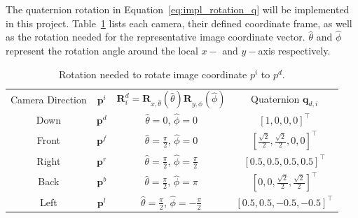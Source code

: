 The quaternion rotation in Equation~\eqref{eq:impl_rotation_q} will be implemented in this project. Table~\ref{tab:impl_quaternion_rotations} lists each camera, their defined coordinate frame, as well as the rotation needed for the representative image coordinate vector. $\hat{\theta}$ and $\hat{\phi}$ represent the rotation angle around the local $x-$ and $y-$axis respectively.

\begin{table}[!htb]
    \centering
    \caption{Rotation needed to rotate image coordinate $p^i$ to $p^d$.}
    \label{tab:impl_quaternion_rotations}
    \begin{tabular}{|c|c|c|c|} \hline
        \multirow{2}{*}{Camera Direction} & \multirow{2}{*}{ $\mathbf{p}^i$} & \multirow{2}{*}{$\mathbf{R}^d_i = \mathbf{R}_{x,\hat{\theta}}(\hat{\theta})\mathbf{R}_{y,\hat{\phi}}(\hat{\phi})$} & \multirow{2}{*}{Quaternion $\mathbf{q}_{d,i}$} \\ &&& \\ \hline \hline
        \multirow{2}{*}{Down} & \multirow{2}{*}{$\mathbf{p}^d$} & \multirow{2}{*}{$\hat{\theta} = 0$, $\hat{\phi} = 0$} & \multirow{2}{*}{$[1,0,0,0]^\top$} \\ &&& \\ \hline
        \multirow{2}{*}{Front} & \multirow{2}{*}{$\mathbf{p}^f$} & \multirow{2}{*}{$\hat{\theta} = \frac{\pi}{2}$, $\hat{\phi} = 0$} & \multirow{2}{*}{$\left[\frac{\sqrt{2}}{2},\frac{\sqrt{2}}{2},0,0\right]^\top$} \\ &&& \\ \hline
        \multirow{2}{*}{Right} & \multirow{2}{*}{$\mathbf{p}^r$} & \multirow{2}{*}{$\hat{\theta} = \frac{\pi}{2}$, $\hat{\phi} = \frac{\pi}{2}$} & \multirow{2}{*}{$[0.5,0.5,0.5,0.5]^\top$} \\ &&& \\ \hline
        \multirow{2}{*}{Back} & \multirow{2}{*}{$\mathbf{p}^b$} & \multirow{2}{*}{$\hat{\theta} = \frac{\pi}{2}$, $\hat{\phi} = \pi$} & \multirow{2}{*}{$\left[0,0,\frac{\sqrt{2}}{2},\frac{\sqrt{2}}{2}\right]^\top$} \\ &&& \\ \hline
        \multirow{2}{*}{Left} & \multirow{2}{*}{$\mathbf{p}^l$} & \multirow{2}{*}{$\hat{\theta} = \frac{\pi}{2}$, $\hat{\phi} = -\frac{\pi}{2}$} & \multirow{2}{*}{$\left[0.5,0.5,-0.5,-0.5\right]^\top$} \\ &&& \\ \hline
    \end{tabular}
\end{table}

